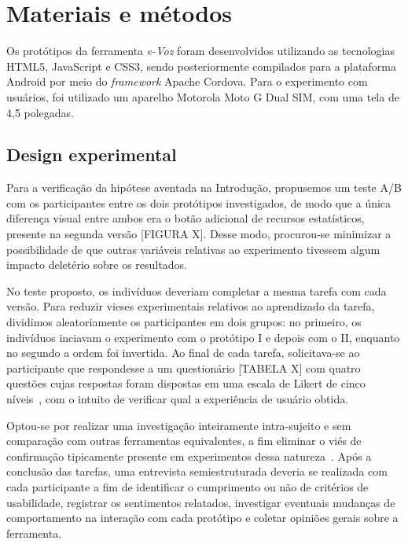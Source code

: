 \documentclass{sigchi}
\begin{document}

\section{Materiais e métodos}
Os protótipos da ferramenta \textit{e-Voz} foram desenvolvidos utilizando as tecnologias HTML5, JavaScript e CSS3, sendo posteriormente compilados para a plataforma Android por meio do \textit{framework} Apache Cordova. Para o experimento com usuários, foi utilizado um aparelho Motorola Moto G Dual SIM, com uma tela de 4,5 polegadas.

\subsection{Design experimental}
Para a verificação da hipótese aventada na Introdução, propusemos um teste A/B com os participantes entre os dois protótipos investigados, de modo que a única diferença visual entre ambos era o botão adicional de recursos estatísticos, presente na segunda versão [FIGURA X]. Desse modo, procurou-se minimizar a possibilidade de que outras variáveis relativas ao experimento tivessem algum impacto deletério sobre os resultados.

No teste proposto, os indivíduos deveriam completar a mesma tarefa com cada versão. Para reduzir vieses experimentais relativos ao aprendizado da tarefa, dividimos aleatoriamente os participantes em dois grupos: no primeiro, os indivíduos inciavam o experimento com o protótipo I e depois com o II, enquanto no segundo a ordem foi invertida. Ao final de cada tarefa, solicitava-se ao participante que respondesse a um questionário [TABELA X] com quatro questões cujas respostas foram dispostas em uma escala de Likert de cinco níveis~\cite{likert:1932}, com o intuito de verificar qual a experiência de usuário obtida.

Optou-se por realizar uma investigação inteiramente intra-sujeito e sem comparação com outras ferramentas equivalentes, a fim eliminar o viés de confirmação tipicamente presente em experimentos dessa natureza~\cite{dell:2012}. Após a conclusão das tarefas, uma entrevista semiestruturada deveria se realizada com cada participante a fim de identificar o cumprimento ou não de critérios de usabilidade, registrar os sentimentos relatados, investigar eventuais mudanças de comportamento na interação com cada protótipo e coletar opiniões gerais sobre a ferramenta.
\end{document}
